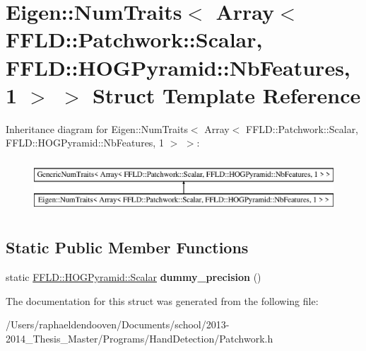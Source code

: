 \hypertarget{struct_eigen_1_1_num_traits_3_01_array_3_01_f_f_l_d_1_1_patchwork_1_1_scalar_00_01_f_f_l_d_1_1_hcd1426a04cfaf6bc4157095debbb74d7}{\section{Eigen\-:\-:Num\-Traits$<$ Array$<$ F\-F\-L\-D\-:\-:Patchwork\-:\-:Scalar, F\-F\-L\-D\-:\-:H\-O\-G\-Pyramid\-:\-:Nb\-Features, 1 $>$ $>$ Struct Template Reference}
\label{struct_eigen_1_1_num_traits_3_01_array_3_01_f_f_l_d_1_1_patchwork_1_1_scalar_00_01_f_f_l_d_1_1_hcd1426a04cfaf6bc4157095debbb74d7}
}
Inheritance diagram for Eigen\-:\-:Num\-Traits$<$ Array$<$ F\-F\-L\-D\-:\-:Patchwork\-:\-:Scalar, F\-F\-L\-D\-:\-:H\-O\-G\-Pyramid\-:\-:Nb\-Features, 1 $>$ $>$\-:\begin{figure}[H]
\begin{center}
\leavevmode
\includegraphics[height=2.000000cm]{struct_eigen_1_1_num_traits_3_01_array_3_01_f_f_l_d_1_1_patchwork_1_1_scalar_00_01_f_f_l_d_1_1_hcd1426a04cfaf6bc4157095debbb74d7}
\end{center}
\end{figure}
\subsection*{Static Public Member Functions}
\begin{DoxyCompactItemize}
\item 
\hypertarget{struct_eigen_1_1_num_traits_3_01_array_3_01_f_f_l_d_1_1_patchwork_1_1_scalar_00_01_f_f_l_d_1_1_hcd1426a04cfaf6bc4157095debbb74d7_a9a62e0bc4289708159eb797b385a1174}{static \hyperlink{class_f_f_l_d_1_1_h_o_g_pyramid_af17c08ed86557e0a0aecb4814daf87c3}{F\-F\-L\-D\-::\-H\-O\-G\-Pyramid\-::\-Scalar} {\bfseries dummy\-\_\-precision} ()}\label{struct_eigen_1_1_num_traits_3_01_array_3_01_f_f_l_d_1_1_patchwork_1_1_scalar_00_01_f_f_l_d_1_1_hcd1426a04cfaf6bc4157095debbb74d7_a9a62e0bc4289708159eb797b385a1174}

\end{DoxyCompactItemize}


The documentation for this struct was generated from the following file\-:\begin{DoxyCompactItemize}
\item 
/\-Users/raphaeldendooven/\-Documents/school/2013-\/2014\-\_\-\-Thesis\-\_\-\-Master/\-Programs/\-Hand\-Detection/Patchwork.\-h\end{DoxyCompactItemize}
